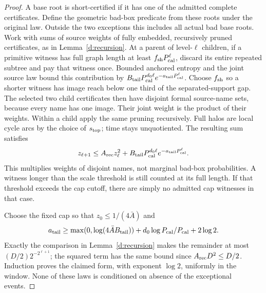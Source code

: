 \begin{proof}
A base root is short-certified if it has one of the admitted complete
certificates. Define the geometric bad-box predicate from these roots
under the original law. Outside the two exceptions this includes all
actual bad base roots. Work with sums of source weights of fully
embedded, recursively pruned certificates, as in Lemma~\ref{d:recursion}.
At a parent of level-\(\ell\) children, if a primitive witness has full
graph length
at least \(f_{\rm sh}P_{\rm cal}^\ell\), discard its entire repeated
subtree and pay that witness once. Bounded anchored entropy and the
joint source law bound this contribution by
\(B_{\rm tail}P_{\rm cal}^{d_0\ell}e^{-a_{\rm tail}P_{\rm cal}^\ell}\).
Choose \(f_{\rm sh}\) so a shorter witness has image reach
below one third of the separated-support gap. The selected two child
certificates then have disjoint formal source-name sets, because every
name has one image. Their joint weight is the product of their
weights. Within a child apply the same pruning recursively. Full halos
are local cycle arcs by the choice of \(s_{\rm top}\); time stays
unquotiented. The resulting sum satisfies
\[
 z_{\ell+1}\le A_{\rm rec}z_\ell^2+
       B_{\rm tail}P_{\rm cal}^{d_0\ell}e^{-a_{\rm tail}P_{\rm cal}^\ell}.
\]
This multiplies weights of disjoint names, not marginal bad-box
probabilities. A witness longer than the scale threshold is still
counted at its full length. If that threshold exceeds the cap cutoff,
there are simply no admitted cap witnesses in that case.

Choose the fixed cap so that \(z_0\le1/(4\bar A)\) and
\[
 a_{\rm tail}\ge\max(0,\log(4\bar A B_{\rm tail}))
                 +d_0\log P_{\rm cal}/P_{\rm cal}+2\log2.
\]
Exactly the comparison in Lemma~\ref{d:recursion} makes the remainder
at most \((D/2)2^{-2^{\ell+1}}\); the squared term has the same bound
since \(A_{\rm rec}D^2\le D/2\). Induction proves the claimed form,
with exponent \(\log2\), uniformly in the window. None of these laws
is conditioned on absence of the exceptional events.
\end{proof}
